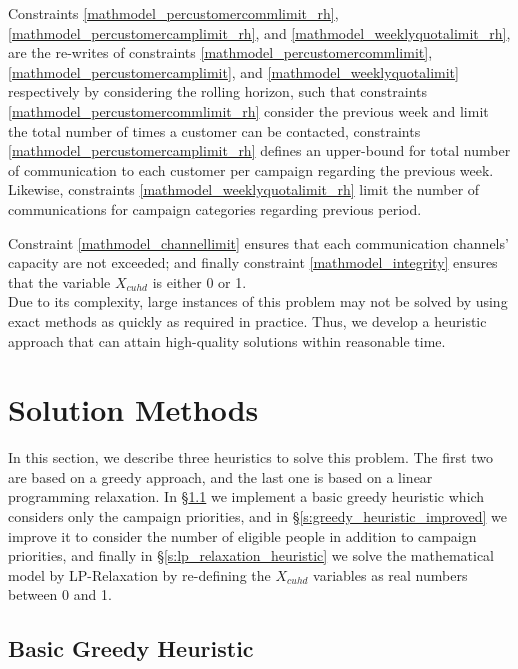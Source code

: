 \documentclass[11pt]{article}
\begin{document}
Constraints \eqref{mathmodel_percustomercommlimit_rh}, \eqref{mathmodel_percustomercamplimit_rh}, and \eqref{mathmodel_weeklyquotalimit_rh}, are the re-writes of constraints \eqref{mathmodel_percustomercommlimit}, \eqref{mathmodel_percustomercamplimit}, and \eqref{mathmodel_weeklyquotalimit} respectively by considering the rolling horizon, such that constraints \eqref{mathmodel_percustomercommlimit_rh} consider the previous week and limit the total number of times a customer can be contacted, constraints \eqref{mathmodel_percustomercamplimit_rh} defines an upper-bound for total number of communication to each customer per campaign regarding the previous week. Likewise, constraints \eqref{mathmodel_weeklyquotalimit_rh} limit the number of communications for campaign categories regarding previous period.

Constraint \eqref{mathmodel_channellimit} ensures that each communication channels' capacity are not exceeded; and finally constraint \eqref{mathmodel_integrity} ensures that the variable $X_{{c}{u}{h}{d}}$ is either 0 or 1.
\\

Due to its complexity, large instances of this problem may not be solved by using exact methods as quickly as required in practice. Thus, we develop a heuristic approach that can attain high-quality solutions within reasonable time.


\section{Solution Methods}  \label{s:solution-method}

In this section, we describe three heuristics to solve this problem. The first two are based on a greedy approach, and the last one is based on a linear programming relaxation. In \S \ref{s:greedy_heuristic_basic} we implement a basic greedy heuristic which considers only the campaign priorities, and in \S \ref{s:greedy_heuristic_improved} we improve it to consider the number of eligible people in addition to campaign priorities, and finally in \S \ref{s:lp_relaxation_heuristic} we solve the mathematical model by LP-Relaxation by re-defining the  $X_{{c}{u}{h}{d}}$ variables as real numbers between 0 and 1.

\subsection{Basic Greedy Heuristic} \label{s:greedy_heuristic_basic}
\end{document}
